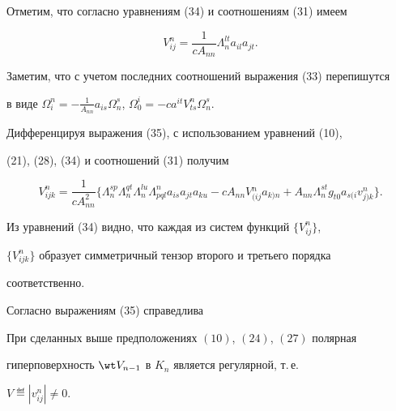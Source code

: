 Отметим, что согласно уравнениям (34) и соотношениям (31) имеем 


\begin{equation} 


V^n_{ij}=\frac{1}{c A_{nn}}\Lambda^{lt}_n a_{il}a_{jt}. 


\end{equation} 


 


Заметим, что с учетом последних соотношений выражения (33) перепишутся 


в виде $\Omega^n_i=-\frac{1}{A_{nn}}a_{is}\Omega^s_n$, $\Omega^i_0=-c 


a^{it}V^n_{ts}\Omega^s_n$. 


 


Дифференцируя выражения (35), с использованием уравнений (10), 


(21), (28), (34) и соотношений (31) получим 


\begin{equation} 


V^n_{ijk}=\frac{1}{c A^2_{nn}}\{\Lambda^{sp}_n 


\Lambda^{qt}_n\Lambda^{lu}_n\Lambda^n_{pql}a_{is}a_{jt}a_{ku}- 


c A_{nn}V{}^n_{(ij}a{}_{k)n}+A_{nn}\Lambda^{st}_n g_{t0} 


a{}_{s(i}v{}^n_{j)k}\}. 


\end{equation} 


 


Из уравнений (34) видно, что каждая из систем функций $\{V^n_{ij}\}$, 


$\{V^n_{ijk}\}$ образует симметричный тензор второго и третьего порядка 


соответственно. 


 


Согласно выражениям (35) справедлива 


 


\begin{thm} 


При сделанных выше предположениях $(10)$, $(24)$, $(27)$ полярная 


гиперповерхность $\wt V_{n-1}$ в $K_n$ является регулярной, т.\,е. 


$V\eqdef|v^n_{ij}|\ne0$. 


\end{thm} 


